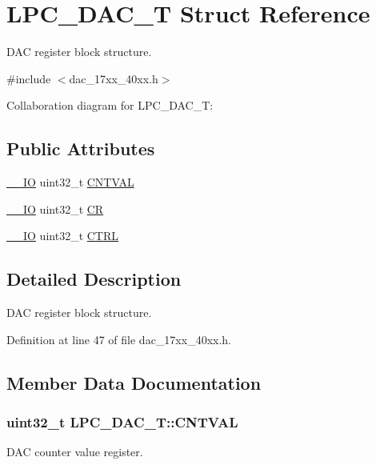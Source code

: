 \hypertarget{structLPC__DAC__T}{}\section{L\+P\+C\+\_\+\+D\+A\+C\+\_\+T Struct Reference}
\label{structLPC__DAC__T}


D\+AC register block structure.  




{\ttfamily \#include $<$dac\+\_\+17xx\+\_\+40xx.\+h$>$}



Collaboration diagram for L\+P\+C\+\_\+\+D\+A\+C\+\_\+T\+:
\subsection*{Public Attributes}
\begin{DoxyCompactItemize}
\item 
\hyperlink{core__cm3_8h_aec43007d9998a0a0e01faede4133d6be}{\+\_\+\+\_\+\+IO} uint32\+\_\+t \hyperlink{structLPC__DAC__T_adfd515a77f5d9e0e7ca6b6835a996c47}{C\+N\+T\+V\+AL}
\item 
\hyperlink{core__cm3_8h_aec43007d9998a0a0e01faede4133d6be}{\+\_\+\+\_\+\+IO} uint32\+\_\+t \hyperlink{structLPC__DAC__T_a9e9bbab757da4f3ef793da168224eb9d}{CR}
\item 
\hyperlink{core__cm3_8h_aec43007d9998a0a0e01faede4133d6be}{\+\_\+\+\_\+\+IO} uint32\+\_\+t \hyperlink{structLPC__DAC__T_a602c1a7a50c8372683c0eef978e2c149}{C\+T\+RL}
\end{DoxyCompactItemize}


\subsection{Detailed Description}
D\+AC register block structure. 

Definition at line 47 of file dac\+\_\+17xx\+\_\+40xx.\+h.



\subsection{Member Data Documentation}
\subsubsection[{\texorpdfstring{C\+N\+T\+V\+AL}{CNTVAL}}]{ uint32\+\_\+t L\+P\+C\+\_\+\+D\+A\+C\+\_\+\+T\+::\+C\+N\+T\+V\+AL}\hypertarget{structLPC__DAC__T_adfd515a77f5d9e0e7ca6b6835a996c47}{}\label{structLPC__DAC__T_adfd515a77f5d9e0e7ca6b6835a996c47}
D\+AC counter value register. 

